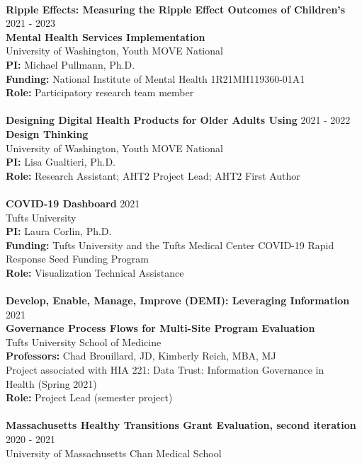 \documentclass[a4paper,12pt]{article}
\begin{document}
{\\
\textbf{Ripple Effects: Measuring the Ripple Effect Outcomes of Children’s} \hfill 2021 - 2023 \\ \textbf{Mental Health Services Implementation} \\
University of Washington, Youth MOVE National\\
\textbf{PI:} Michael Pullmann, Ph.D.\\
\textbf{Funding:} National Institute of Mental Health 1R21MH119360-01A1\\
\textbf{Role:} Participatory research team member\\
\\
\textbf{Designing Digital Health Products for Older Adults Using} \hfill 2021 - 2022 \\ \textbf{Design Thinking} \\
University of Washington, Youth MOVE National\\
\textbf{PI:} Lisa Gualtieri, Ph.D.\\
\textbf{Role:} Research Assistant; AHT2 Project Lead; AHT2 First Author\\
\\
\textbf{COVID-19 Dashboard} \hfill 2021\\
Tufts University\\
\textbf{PI:} Laura Corlin, Ph.D.\\
\textbf{Funding:} Tufts University and the Tufts Medical Center COVID-19 Rapid Response Seed Funding Program\\
\textbf{Role:} Visualization Technical Assistance\\
\\
\textbf{Develop, Enable, Manage, Improve (DEMI): Leveraging Information} \hfill 2021\\ \textbf{Governance Process Flows for Multi-Site Program Evaluation} \\
Tufts University School of Medicine\\
\textbf{Professors:} Chad Brouillard, JD, Kimberly Reich, MBA, MJ\\
Project associated with HIA 221: Data Trust: Information Governance in \\Health (Spring 2021)\\
\textbf{Role:} Project Lead (semester project)\\
\\
\textbf{Massachusetts Healthy Transitions Grant Evaluation, second iteration} \hfill 2020 - 2021 \\
University of Massachusetts Chan Medical School \\
}
\end{document}
